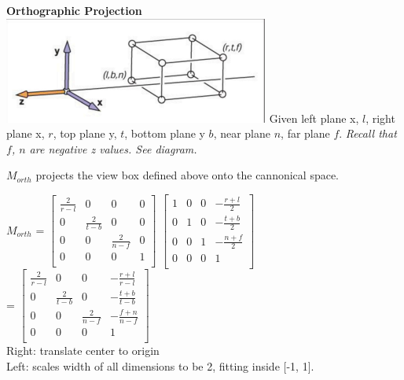 \documentclass[letterpaper, 8pt]{extarticle}
\begin{document}
\begin{multicols*}{4}
\textbf{Orthographic Projection}\\

\includegraphics[width=\linewidth]{cam-ortho.png} 
Given left plane x, $l$, right plane x, $r$, top plane y, $t$, bottom plane y $b$, near plane $n$, far plane $f$.
\textit{Recall that $f$, $n$ are negative z values. See diagram.}

$M_{orth}$ projects the view box defined above onto the cannonical space. 


$M_{orth}$ = \(
\begin{bmatrix}
    \frac{2}{r-l} & 0 & 0 & 0 \\
    0 & \frac{2}{t-b} & 0 & 0 \\
    0 & 0 & \frac{2}{n-f} & 0 \\
    0 & 0 & 0 & 1 \\
\end{bmatrix}
\)
\(
\begin{bmatrix}
    1 & 0 & 0 & -\frac{r+l}{2} \\
    0 & 1 & 0 & -\frac{t+b}{2} \\
    0 & 0 & 1 & -\frac{n+f}{2} \\
    0 & 0 & 0 & 1 \\
\end{bmatrix}
\)\\
=
\(
\begin{bmatrix}
    \frac{2}{r-l} & 0 & 0 & -\frac{r+l}{r-l} \\
    0 & \frac{2}{t-b} & 0 & -\frac{t+b}{t-b} \\
    0 & 0 & \frac{2}{n-f} & -\frac{f+n}{n-f} \\
    0 & 0 & 0 & 1 \\
\end{bmatrix}
\)\\
Right: translate center to origin\\
Left: scales width of all dimensions to be 2, fitting inside [-1, 1].


\end{multicols*}
\end{document}
